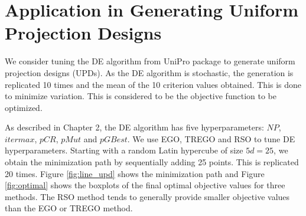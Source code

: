 \documentclass [PhD] {package/uclathes}
\begin{document}
\section{Application in {Generating Uniform Projection Designs}}
We consider tuning the DE algorithm from UniPro package to generate uniform projection designs (UPDs). As the DE algorithm is stochastic, the generation is replicated 10 times and the mean of the 10 criterion values obtained. This is done to minimize variation. This is considered to be the objective function to be optimized.


As described in Chapter 2, the DE algorithm has five hyperparameters: $NP$, $itermax$, $pCR$, $pMut$ and $pGBest$. We use EGO, TREGO and RSO to tune DE hyperparameters. %
Starting with a random Latin hypercube of size $5d=25$, we obtain the minimization path by sequentially adding 25 points. This is replicated 20 times. Figure \ref{fig:line_upd} shows the minimization path and Figure \ref{fig:optimal} shows the boxplots of the final optimal objective values for three methods. The RSO method tends to generally provide smaller objective values than the EGO or TREGO method.  %
\end{document}
